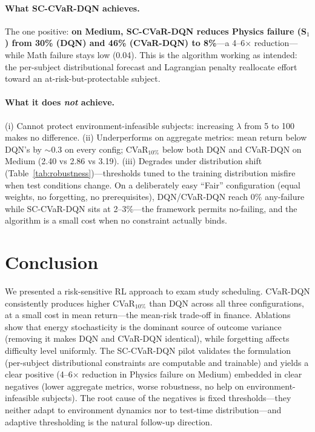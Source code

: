 \documentclass[a4paper,11pt]{article}
\theoremstyle{definition}
\begin{document}
\paragraph{What SC-CVaR-DQN achieves.} The one positive: \textbf{on Medium, SC-CVaR-DQN reduces Physics failure (S$_1$) from 30\% (DQN) and 46\% (CVaR-DQN) to 8\%}---a 4--6$\times$ reduction---while Math failure stays low (0.04). This is the algorithm working as intended: the per-subject distributional forecast and Lagrangian penalty reallocate effort toward an at-risk-but-protectable subject.

\paragraph{What it does \emph{not} achieve.} (i) Cannot protect environment-infeasible subjects: increasing $\lambda$ from 5 to 100 makes no difference. (ii) Underperforms on aggregate metrics: mean return below DQN's by $\sim 0.3$ on every config; CVaR$_{10\%}$ below both DQN and CVaR-DQN on Medium (2.40 vs 2.86 vs 3.19). (iii) Degrades under distribution shift (Table~\ref{tab:robustness})---thresholds tuned to the training distribution misfire when test conditions change. On a deliberately easy ``Fair'' configuration (equal weights, no forgetting, no prerequisites), DQN/CVaR-DQN reach 0\% any-failure while SC-CVaR-DQN sits at 2--3\%---the framework permits no-failing, and the algorithm is a small cost when no constraint actually binds.

\section{Conclusion}
\label{sec:conclusion}

We presented a risk-sensitive RL approach to exam study scheduling. CVaR-DQN consistently produces higher CVaR$_{10\%}$ than DQN across all three configurations, at a small cost in mean return---the mean-risk trade-off in finance. Ablations show that energy stochasticity is the dominant source of outcome variance (removing it makes DQN and CVaR-DQN identical), while forgetting affects difficulty level uniformly. The SC-CVaR-DQN pilot validates the formulation (per-subject distributional constraints are computable and trainable) and yields a clear positive (4--6$\times$ reduction in Physics failure on Medium) embedded in clear negatives (lower aggregate metrics, worse robustness, no help on environment-infeasible subjects). The root cause of the negatives is fixed thresholds---they neither adapt to environment dynamics nor to test-time distribution---and adaptive thresholding is the natural follow-up direction.
\end{document}
